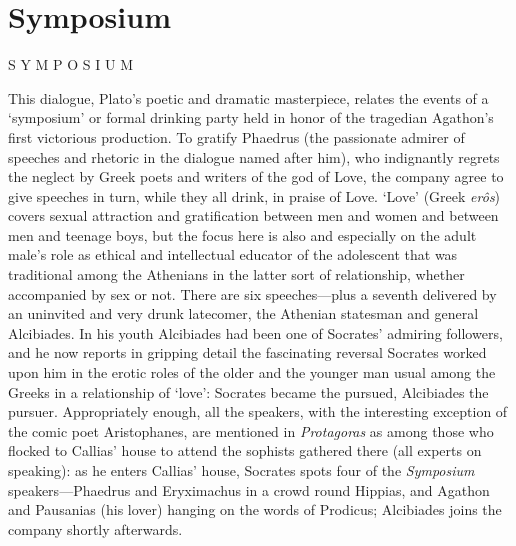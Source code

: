 \part[symposium]{Symposium}

\noindent\centerline{ S\kern 5.5pt%
                                 Y\kern 5.5pt%
                                 M\kern 6pt%
                                 P\kern 4pt%
                                 O\kern 4.5pt%
                                 S\kern 6pt%
                                 I\kern 5.5pt%
                                 U\kern 5pt%
                                 M}

\startchapter[title=Foreword]

This dialogue, Plato’s poetic and dramatic masterpiece, relates the
events of a ‘symposium’ or formal drinking party held in honor of
the tragedian Agathon’s first victorious production. To gratify
Phaedrus (the passionate admirer of speeches and rhetoric in the
dialogue named after him), who indignantly regrets the neglect by
Greek poets and writers of the god of Love, the company agree to
give speeches in turn, while they all drink, in praise of Love. ‘Love’
(Greek {\em erôs}) covers sexual attraction and gratification
between men and women and between men and teenage boys, but the
focus here is also and especially on the adult male’s role as
ethical and intellectual educator of the adolescent that was
traditional among the Athenians in the latter sort of relationship,
whether accompanied by sex or not. There are six speeches---plus a
seventh delivered by an uninvited and very drunk latecomer, the
Athenian statesman and general Alcibiades. In his youth Alcibiades
had been one of Socrates’ admiring followers, and he now reports
in gripping detail the fascinating reversal Socrates worked upon
him in the erotic roles of the older and the younger man usual
among the Greeks in a relationship of ‘love’: Socrates became the
pursued, Alcibiades the pursuer. Appropriately enough, all the
speakers, with the interesting exception of the comic poet
Aristophanes, are mentioned in {\em Protagoras} as among those who
flocked to Callias’ house to attend the sophists gathered there
(all experts on speaking): as he enters Callias’ house, Socrates spots 
four of the {\em Symposium} speakers---Phaedrus and Eryximachus in
a crowd round Hippias, and Agathon and Pausanias (his lover)
hanging on the words of Prodicus; Alcibiades joins the company
shortly afterwards.

